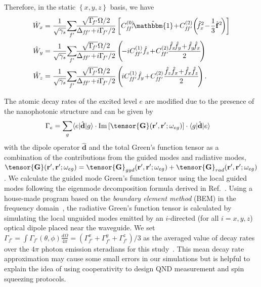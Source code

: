 \documentclass[aps,pra,twocolumn,superscriptaddress]{revtex4-1} %
\def\br{\mathbf{r}}
\def\bra#1{\langle{#1}\rvert}%
\def\ket#1{\lvert{#1}\rangle}%
\newcommand{\nn}{\nonumber}
\begin{document}
\begin{appendix}
Therefore, in the static $ \left\{x,y,z \right\} $ basis, we have
\begin{align}
\hat{W}_{x} &= \frac{1}{\sqrt{\gamma_s}}\!\sum_{f'}\!\! \frac{\sqrt{\Gamma\!_{f'}}\Omega/2}{\Delta_{f\!f'}\!+\!i\Gamma\!_{f'}/2} \left[C_{f\!f'}^{(0)}\!\hat{\mathbbm{1}} \!+\! C_{f\!f'}^{(2)}\!\left(\!\hat{f}_{x}^2 \!-\! \frac{1}{3}\hat{\mathbf{f}}^2\! \right) \right]\nn\\
\hat{W}_{y} &= \frac{1}{\sqrt{\gamma_s}}\!\sum_{f'}\!\! \frac{\sqrt{\Gamma\!_{f'}}\Omega/2}{\Delta_{f\!f'} \!+\! i\Gamma\!_{f'}/2} \left(\!-iC_{f\!f'}^{(1)}\hat{f}_z \!+\! C_{f\!f'}^{(2)}\!\frac{\hat{f}_{x}\!\hat{f}_{y} \!+\! \hat{f}_{y}\!\hat{f}_{x}}{2}\! \right)\nn\\
\hat{W}_{z} &= \frac{1}{\sqrt{\gamma_s}}\!\sum_{f'}\!\! \frac{\sqrt{\Gamma\!_{f'}}\Omega/2}{\Delta_{f\!f'} \!+\! i\Gamma\!_{f'}/2} \left(\!iC_{f\!f'}^{(1)}\hat{f}_{y} \!+\! C_{f\!f'}^{(2)}\frac{\hat{f}_z\hat{f}_{x} \!+\! \hat{f}_{x}\hat{f}_z}{2} \! \right).\nn
\end{align}

The atomic decay rates of the excited level $ e $ are modified due to the presence of the nanophotonic structure and can be given by
\begin{align}
\Gamma_e &= \sum_g \bra{e}\hat{\mathbf{d}}\ket{g} \cdot \mathrm{Im}\left[\tensor{\mathbf{G}}(\br',\br';\omega_{eg}) \right]\cdot \bra{g}\hat{\mathbf{d}}\ket{e}
\end{align}
with the dipole operator $ \hat{\mathbf{d}} $ and the total Green's function tensor as a combination of the contributions from the guided modes and radiative modes, $ \tensor{\mathbf{G}}(\br',\br';\omega_{eg})=\tensor{\mathbf{G}}_{gyd}(\br',\br';\omega_{eg})+\tensor{\mathbf{G}}_{rad}(\br',\br';\omega_{eg}) $.
We calculate the guided mode Green's function tensor using the local guided modes following the eigenmode decomposition formula derived in Ref.~\cite{Qi2016}. Using a house-made program based on the \textit{boundary element method} (BEM) in the frequency domain~\cite{Abajo2002,GarciadeAbajo1998Relativistic}, the radiative Green's function tensor is calculated by simulating the local unguided modes emitted by an $i$-directed (for all $ i=x,y,z $) optical dipole placed near the waveguide. We set $ \Gamma_{f'}= \int \Gamma_{f'}(\theta,\phi)\frac{d\Omega}{4\pi}=(\Gamma_{f'}^x+\Gamma_{f'}^y+\Gamma_{f'}^z)/3$ as the averaged value of decay rates over the $4\pi$ photon emission steradians for this study~\cite{Novotny2012}. This mean decay rate approximation may cause some small errors in our simulations but is helpful to explain the idea of using cooperativity to design QND measurement and spin squeezing protocols.


\end{appendix}
\end{document}
